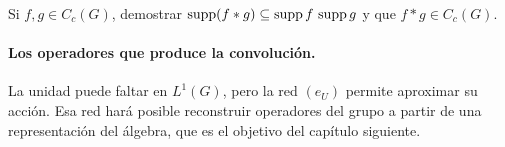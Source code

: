 \begin{ejercicio}\label{ej:v4-l22-5}
Si $f,g\in C_c(G)$, demostrar $\operatorname{supp}(f*g)\subseteq\operatorname{supp} f\,\operatorname{supp} g$ y que $f*g\in C_c(G)$.
\end{ejercicio}


\paragraph{Los operadores que produce la convolución.}
La unidad puede faltar en $L^1(G)$, pero la red $(e_U)$ permite aproximar su acción. Esa red hará posible reconstruir operadores del grupo a partir de una representación del álgebra, que es el objetivo del capítulo siguiente.
